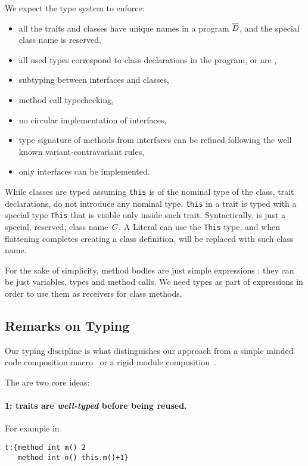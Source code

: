 We expect the type system to enforce: 
\begin{itemize}
\item all the traits and classes have unique names in a program $\overline{\mathit{D}}$, and the special class name
\Q@This@ is reserved,
\item all used types correspond to class declarations in the program, or are \Q@This@, 
\item subtyping between interfaces and classes,
\item method call typechecking,
\item no circular implementation of interfaces,
\item type signature of methods from interfaces can be refined following the well known variant-contravariant rules,
\item only interfaces can be implemented.
\end{itemize}
While classes are typed assuming \lstinline{this} is of the nominal type of the
class, trait declarations, do not introduce any nominal type.  \lstinline{this}
in a trait is typed with a special type \lstinline{This} that is visible only
inside such trait. Syntactically, \Q@This@ is just a special, reserved, class name $\mathit{C}$.
A Literal can use the \lstinline{This} type,
and when flattening completes creating a class definition, \Q@This@ will be replaced with such class name.

For the sake of simplicity, method bodies are just simple expressions
\me: they can be just variables, types and method calls. We need types as part of expressions in order to use them as receivers for class methods.

\subsection{Remarks on Typing}
 Our typing discipline is 
what distinguishes our approach from a simple minded code composition macro~\cite{bawden1999quasiquotation}
or a rigid module composition~\cite{ancona2002calculus}.

The are two core ideas:

\paragraph{1: traits are \emph{well-typed} before being reused.}
 For example in

\saveSpace\begin{lstlisting}
t:{method int m() 2 
   method int n() this.m()+1}
\end{lstlisting}\saveSpace

